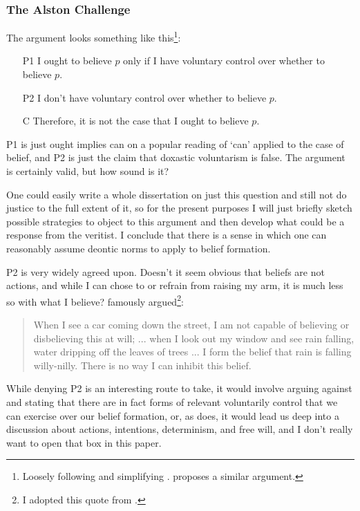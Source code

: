 \documentclass[12pt,numbers=noenddot]{scrartcl}
\begin{document}
\subsubsection{The Alston Challenge}

The argument looks something like this\footnote{Loosely following and simplifying \textcite{Alston1988-ALSTDC}. \textcite{Feldman2000-FELTEO-2} proposes a similar argument.}:

\begin{enumerate}
    \item[P1] I ought to believe $p$ only if I have voluntary control over whether to believe $p$.
    \item[P2] I don't have voluntary control over whether to believe $p$.
    \item[C] Therefore, it is not the case that I ought to believe $p$.
\end{enumerate}

P1 is just ought implies can on a popular reading of ‘can’ applied to the case of belief, and P2 is just the claim that doxastic voluntarism is false. The argument is certainly valid, but how sound is it?

One could easily write a whole dissertation on just this question and still not do justice to the full extent of it, so for the present purposes I will just briefly sketch possible strategies to object to this argument and then develop what could be a response from the veritist. I conclude that there is a sense in which one can reasonably assume deontic norms to apply to belief formation.

P2 is very widely agreed upon. Doesn't it seem obvious that beliefs are not actions, and while I can chose to or refrain from raising my arm, it is much less so with what I believe? \textcite[91]{Alston1989} famously argued\footnote{I adopted this quote from \textcite{Steup2000-STEDVA}.}:

\begin{quote}
    When I see a car coming down the street, I am not capable of believing or disbelieving this at will; ... when I look out my window and see rain falling, water dripping off the leaves of trees ... I form the belief that rain is falling willy-nilly. There is no way I can inhibit this belief.
\end{quote}

While denying P2 is an interesting route to take, it would involve arguing against \textcite{Alston1988-ALSTDC} and stating that there are in fact forms of relevant voluntarily control that we can exercise over our belief formation, or, as \textcite{Steup2000-STEDVA} does, it would lead us deep into a discussion about actions, intentions, determinism, and free will, and I don't really want to open that box in this paper. 
\end{document}
